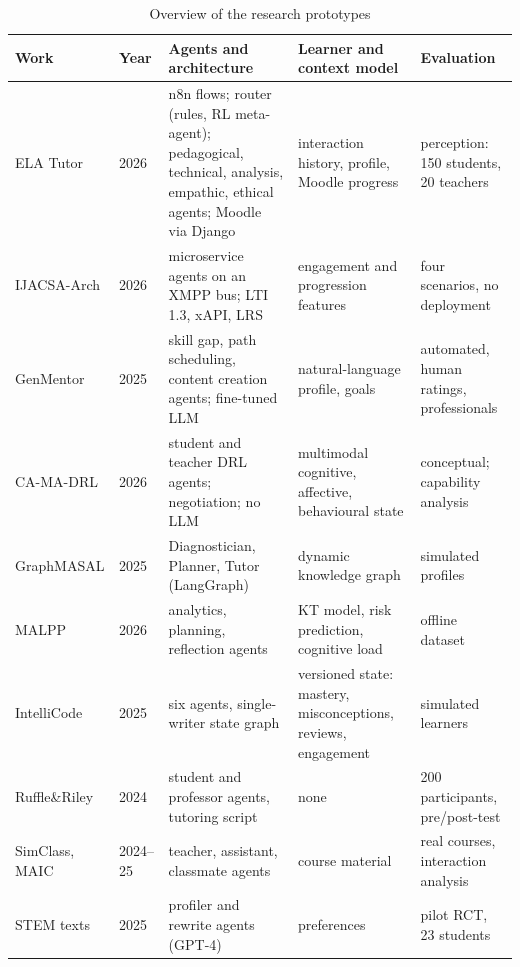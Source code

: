 \begin{table}[htbp]
\centering
\caption{Overview of the research prototypes}
\label{tab-related-overview}
\scriptsize
\begin{tabularx}{\textwidth}{@{}L{2.2cm}L{0.7cm}YYY@{}}
\toprule
\textbf{Work} & \textbf{Year} & \textbf{Agents and architecture} & \textbf{Learner and context model} & \textbf{Evaluation} \\
\midrule
ELA Tutor \cite{lopezgoyez2026ela,lopezgoyez2026exploratory} & 2026 & n8n flows; router (rules, RL meta-agent); pedagogical, technical, analysis, empathic, ethical agents; Moodle via Django & interaction history, profile, Moodle progress & perception: 150 students, 20 teachers \\
IJACSA-Arch \cite{khaddar2026ijacsa} & 2026 & microservice agents on an XMPP bus; LTI 1.3, xAPI, LRS & engagement and progression features & four scenarios, no deployment \\
GenMentor \cite{wang2025genmentor} & 2025 & skill gap, path scheduling, content creation agents; fine-tuned LLM & natural-language profile, goals & automated, human ratings, professionals \\
CA-MA-DRL \cite{sharif2026camadrl} & 2026 & student and teacher DRL agents; negotiation; no LLM & multimodal cognitive, affective, behavioural state & conceptual; capability analysis \\
GraphMASAL \cite{zeng2025graphmasal} & 2025 & Diagnostician, Planner, Tutor (LangGraph) & dynamic knowledge graph & simulated profiles \\
MALPP \cite{xu2026malpp} & 2026 & analytics, planning, reflection agents & KT model, risk prediction, cognitive load & offline dataset \\
IntelliCode \cite{david2025intellicode} & 2025 & six agents, single-writer state graph & versioned state: mastery, misconceptions, reviews, engagement & simulated learners \\
Ruffle\&Riley \cite{schmucker2024ruffle} & 2024 & student and professor agents, tutoring script & none & 200 participants, pre/post-test \\
SimClass, MAIC \cite{zhang2025simclass,yu2024maic} & 2024--25 & teacher, assistant, classmate agents & course material & real courses, interaction analysis \\
STEM texts \cite{vaccaro2025stem} & 2025 & profiler and rewrite agents (GPT-4) & preferences & pilot RCT, 23 students \\
\bottomrule
\end{tabularx}
\end{table}

